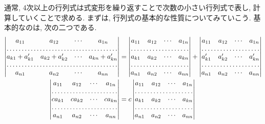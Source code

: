 \documentclass[a4j,dvipdfmx]{jsarticle}
\numberwithin{equation}{section}
\begin{document}
            通常, 4次以上の行列式は式変形を繰り返すことで次数の小さい行列式で表し, 計算していくことで求める. 
            まずは, 行列式の基本的な性質についてみていこう. 基本的なのは, 次の二つである.
            \begin{align}
                \begin{vmatrix}
                    a_{11} & a_{12} & \cdots & a_{1n} \\
                    \hdotsfor{4}\\
                    a_{k1}+a_{k1}' & a_{k2}+a_{k2}' & \cdots & a_{kn}+a_{kn}' \\
                    \hdotsfor{4}\\
                    a_{n1} & a_{n2} & \cdots & a_{nn}
                \end{vmatrix}
                &=\begin{vmatrix}
                    a_{11} & a_{12} & \cdots & a_{1n} \\
                    \hdotsfor{4}\\
                    a_{k1} & a_{k2} & \cdots & a_{kn} \\
                    \hdotsfor{4}\\
                    a_{n1} & a_{n2} & \cdots & a_{nn}
                \end{vmatrix}
                +\begin{vmatrix}
                    a_{11} & a_{12} & \cdots & a_{1n} \\
                    \hdotsfor{4}\\
                    a_{k1}' & a_{k2}' & \cdots & a_{kn}' \\
                    \hdotsfor{4}\\
                    a_{n1} & a_{n2} & \cdots & a_{nn}
                \end{vmatrix}
                \label{eq:線形代数:行列式の和}\\
                \begin{vmatrix}
                    a_{11} & a_{12} & \cdots & a_{1n} \\
                    \hdotsfor{4}\\
                    ca_{k1} & ca_{k2} & \cdots & ca_{kn} \\
                    \hdotsfor{4}\\
                    a_{n1} & a_{n2} & \cdots & a_{nn}
                \end{vmatrix}
                &=c\begin{vmatrix}
                    a_{11} & a_{12} & \cdots & a_{1n} \\
                    \hdotsfor{4}\\
                    a_{k1} & a_{k2} & \cdots & a_{kn} \\
                    \hdotsfor{4}\\
                    a_{n1} & a_{n2} & \cdots & a_{nn}
                \end{vmatrix}
                \label{eq:線形代数:行列式のスカラー倍}
            \end{align}
\end{document}
